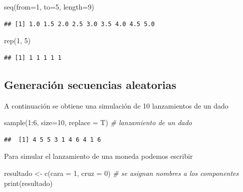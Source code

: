 \documentclass[
]{book}
\newenvironment{Shaded}{\begin{snugshade}}{\end{snugshade}}
\newcommand{\AttributeTok}[1]{\textcolor[rgb]{0.77,0.63,0.00}{#1}}
\newcommand{\CommentTok}[1]{\textcolor[rgb]{0.56,0.35,0.01}{\textit{#1}}}
\newcommand{\DecValTok}[1]{\textcolor[rgb]{0.00,0.00,0.81}{#1}}
\newcommand{\FunctionTok}[1]{\textcolor[rgb]{0.00,0.00,0.00}{#1}}
\newcommand{\NormalTok}[1]{#1}
\newcommand{\OtherTok}[1]{\textcolor[rgb]{0.56,0.35,0.01}{#1}}
\newcommand{\SpecialCharTok}[1]{\textcolor[rgb]{0.00,0.00,0.00}{#1}}
\theoremstyle{break}
\theoremstyle{nonumberplain}
\begin{document}
\begin{Shaded}
\begin{Highlighting}[]
\FunctionTok{seq}\NormalTok{(}\AttributeTok{from=}\DecValTok{1}\NormalTok{, }\AttributeTok{to=}\DecValTok{5}\NormalTok{, }\AttributeTok{length=}\DecValTok{9}\NormalTok{)}
\end{Highlighting}
\end{Shaded}

\begin{verbatim}
## [1] 1.0 1.5 2.0 2.5 3.0 3.5 4.0 4.5 5.0
\end{verbatim}

\begin{Shaded}
\begin{Highlighting}[]
\FunctionTok{rep}\NormalTok{(}\DecValTok{1}\NormalTok{, }\DecValTok{5}\NormalTok{)}
\end{Highlighting}
\end{Shaded}

\begin{verbatim}
## [1] 1 1 1 1 1
\end{verbatim}

\hypertarget{generaciuxf3n-secuencias-aleatorias}{%
\subsection{Generación secuencias aleatorias}\label{generaciuxf3n-secuencias-aleatorias}}

A continuación se obtiene una simulación de 10 lanzamientos de un dado

\begin{Shaded}
\begin{Highlighting}[]
\FunctionTok{sample}\NormalTok{(}\DecValTok{1}\SpecialCharTok{:}\DecValTok{6}\NormalTok{, }\AttributeTok{size=}\DecValTok{10}\NormalTok{, }\AttributeTok{replace =}\NormalTok{ T) }\CommentTok{\# lanzamiento de un dado}
\end{Highlighting}
\end{Shaded}

\begin{verbatim}
##  [1] 4 5 5 3 1 4 6 4 1 6
\end{verbatim}

Para simular el lanzamiento de una moneda podemos escribir

\begin{Shaded}
\begin{Highlighting}[]
\NormalTok{resultado }\OtherTok{\textless{}{-}} \FunctionTok{c}\NormalTok{(}\AttributeTok{cara =} \DecValTok{1}\NormalTok{, }\AttributeTok{cruz =} \DecValTok{0}\NormalTok{) }\CommentTok{\# se asignan nombres a los componentes}
\FunctionTok{print}\NormalTok{(resultado)}
\end{Highlighting}
\end{Shaded}
\end{document}
